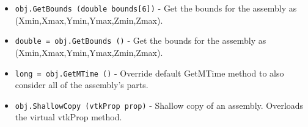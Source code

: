 \begin{itemize}
\item  \verb|obj.GetBounds (double bounds[6])| -  Get the bounds for the assembly as (Xmin,Xmax,Ymin,Ymax,Zmin,Zmax).

\item  \verb|double = obj.GetBounds ()| -  Get the bounds for the assembly as (Xmin,Xmax,Ymin,Ymax,Zmin,Zmax).

\item  \verb|long = obj.GetMTime ()| -  Override default GetMTime method to also consider all of the
 assembly's parts.

\item  \verb|obj.ShallowCopy (vtkProp prop)| -  Shallow copy of an assembly. Overloads the virtual vtkProp method.

\end{itemize}
